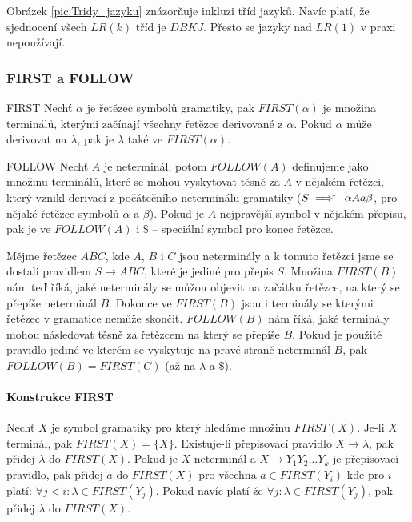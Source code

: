 Obrázek \ref{pic:Tridy_jazyku} znázorňuje inkluzi tříd jazyků. Navíc platí, že sjednocení všech \(LR(k)\) tříd je \(DBKJ\). Přesto se jazyky nad \(LR(1)\) v praxi nepoužívají.


\subsubsection{FIRST a FOLLOW}

\begin{definiceN}{FIRST}
	Nechť \(\alpha\) je řetězec symbolů gramatiky, pak \(FIRST(\alpha)\) je množina terminálů, kterými začínají všechny řetězce derivované z \(\alpha\). Pokud \(\alpha\) může derivovat na \(\lambda\), pak je \(\lambda\) také ve \(FIRST(\alpha)\).
\end{definiceN}

\begin{definiceN}{FOLLOW}
	Nechť \(A\) je neterminál, potom \(FOLLOW(A)\) definujeme jako množinu terminálů, které se mohou vyskytovat těsně za \(A\) v nějakém řetězci, který vznikl derivací z počátečního neterminálu gramatiky (\(S \implies \hskip -0.7em ^* \hskip 0.7em \alpha A a \beta\), pro nějaké řetězce symbolů \(\alpha\) a \(\beta\)). Pokud je \(A\) nejpravější symbol v nějakém přepisu, pak je ve \(FOLLOW(A)\) i \(\$\) -- speciální symbol pro konec řetězce.
\end{definiceN}

\begin{priklad}
	Mějme řetězec \(ABC\), kde \(A\), \(B\) i \(C\) jsou neterminály a k tomuto řetězci jsme se dostali pravidlem \(S \to ABC\), které je jediné pro přepis \(S\). Množina \(FIRST(B)\) nám teď říká, jaké neterminály se můžou objevit na začátku řetězce, na který se přepíše neterminál \(B\). Dokonce ve \(FIRST(B)\) jsou i terminály se kterými řetězec v gramatice nemůže skončit. \(FOLLOW(B)\) nám říká, jaké terminály mohou následovat těsně za řetězcem na který se přepíše \(B\). Pokud je použité pravidlo jediné ve kterém se vyskytuje na pravé straně neterminál \(B\), pak \(FOLLOW(B) = FIRST(C)\) (až na \(\lambda\) a \(\$\)).
\end{priklad}

\paragraph{Konstrukce FIRST} Nechť \(X\) je symbol gramatiky pro který hledáme množinu \(FIRST(X)\). Je-li \(X\) terminál, pak \(FIRST(X) = \{X\}\). Existuje-li přepisovací pravidlo \(X \to \lambda\), pak přidej \(\lambda\) do \(FIRST(X)\). Pokud je \(X\) neterminál a \(X \to Y_1 Y_2 \ldots Y_k\) je přepisovací pravidlo, pak přidej \(a\) do \(FIRST(X)\) pro všechna \(a \in FIRST(Y_i)\) kde pro \(i\) platí: \(\forall j<i: \lambda \in FIRST(Y_j)\). Pokud navíc platí že \(\forall j: \lambda \in FIRST(Y_j)\), pak přidej \(\lambda\) do \(FIRST(X)\).


